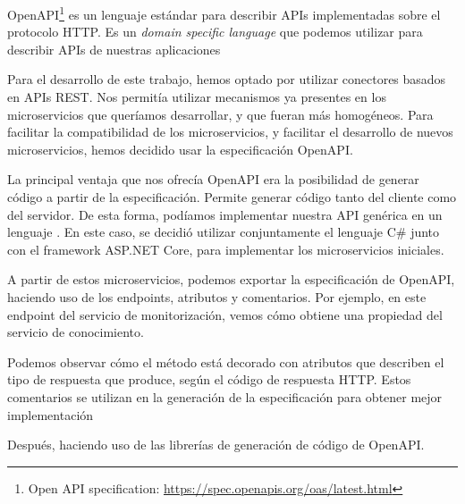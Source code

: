 OpenAPI\footnote{Open API specification: \url{https://spec.openapis.org/oas/latest.html}} es un lenguaje estándar para describir APIs implementadas sobre el protocolo HTTP. Es un \textit{domain specific language} que podemos utilizar para describir APIs de nuestras aplicaciones

Para el desarrollo de este trabajo, hemos optado por utilizar conectores basados en APIs REST. Nos permitía utilizar mecanismos ya presentes en los microservicios que queríamos desarrollar, y que fueran más homogéneos.
Para facilitar la compatibilidad de los microservicios, y facilitar el desarrollo de nuevos microservicios, hemos decidido usar la especificación OpenAPI.

La principal ventaja que nos ofrecía OpenAPI era la posibilidad de generar código a partir de la especificación. Permite generar código tanto del cliente como del servidor. De esta forma, podíamos implementar nuestra API genérica en un lenguaje . En este caso, se decidió utilizar conjuntamente el lenguaje C\# junto con el framework ASP.NET Core, para implementar los microservicios iniciales.

A partir de estos microservicios, podemos exportar la especificación de OpenAPI, haciendo uso de los endpoints, atributos y comentarios. Por ejemplo, en este endpoint del servicio de monitorización, vemos cómo obtiene una propiedad del servicio de conocimiento.

Podemos observar cómo el método está decorado con atributos que describen el tipo de respuesta que produce, según el código de respuesta HTTP. Estos comentarios se utilizan en la generación de la especificación para obtener mejor implementación

Después, haciendo uso de las librerías de generación de código de OpenAPI.
